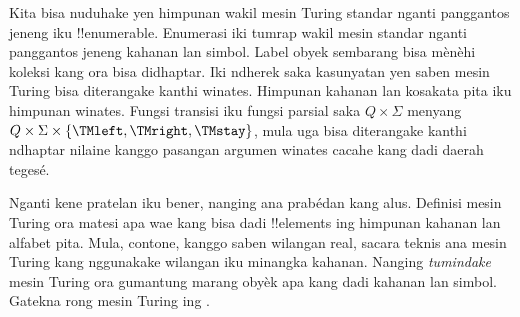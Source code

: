 \documentclass[../../../include/open-logic-section]{subfiles}
\begin{document}

\begin{explain}
Kita bisa nuduhake yen himpunan wakil mesin Turing standar nganti panggantos jeneng iku
!!{enumerable}. Enumerasi iki tumrap wakil mesin standar nganti panggantos jeneng kahanan lan simbol. Label obyek sembarang bisa mènèhi koleksi kang ora bisa didhaptar. Iki ndherek saka kasunyatan yen saben
mesin Turing bisa diterangake kanthi winates. Himpunan
kahanan lan kosakata pita iku himpunan winates. Fungsi
transisi iku fungsi parsial saka $Q \times \Sigma$
menyang $Q \times \Sigma \times \{\TMleft, \TMright, \TMstay\}$,
mula uga bisa diterangake kanthi ndhaptar nilaine
kanggo pasangan argumen winates cacahe kang dadi
daerah tegesé.

Nganti kene pratelan iku bener, nanging ana prabédan
kang alus. Definisi mesin Turing ora matesi apa wae
kang bisa dadi !!{element}s ing himpunan kahanan
lan alfabet pita. Mula, contone, kanggo saben
wilangan real, sacara teknis ana mesin Turing
kang nggunakake wilangan iku minangka kahanan.
Nanging \emph{tumindake} mesin Turing ora gumantung
marang obyèk apa kang dadi kahanan lan simbol.
Gatekna rong mesin Turing ing .
\begin{figure}
\begin{center}
\\
\end{center}
\end{figure}
\end{explain}
\end{document}
